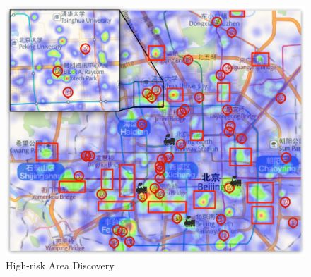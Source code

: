 \begin{figure}[t!]
	\centering
	\includegraphics[width=.7\columnwidth]{figs/phone.pdf}
	\caption{High-risk Area Discovery}
	\label{fig:heatmap}
\end{figure}







